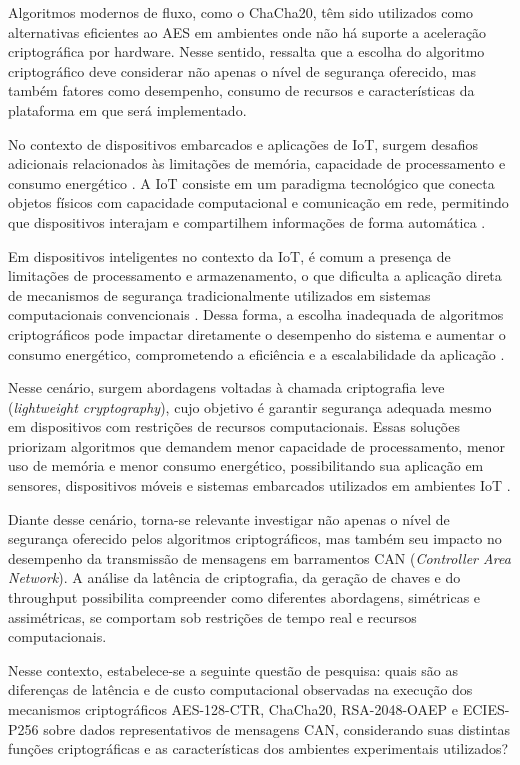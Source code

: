 Algoritmos modernos de fluxo, como o ChaCha20, têm sido utilizados como alternativas eficientes ao AES em ambientes onde não há suporte a aceleração criptográfica por hardware. Nesse sentido, \cite{almeida2025revisao} ressalta que a escolha do algoritmo criptográfico deve considerar não apenas o nível de segurança oferecido, mas também fatores como desempenho, consumo de recursos e características da plataforma em que será implementado.

No contexto de dispositivos embarcados e aplicações de IoT, surgem desafios adicionais relacionados às limitações de memória, capacidade de processamento e consumo energético \cite{pereira2020challenges}. A IoT consiste em um paradigma tecnológico que conecta objetos físicos com capacidade computacional e comunicação em rede, permitindo que dispositivos interajam e compartilhem informações de forma automática \cite{pauferro2020iot}. 

Em dispositivos inteligentes no contexto da IoT, é comum a presença de limitações de processamento e armazenamento, o que dificulta a aplicação direta de mecanismos de segurança tradicionalmente utilizados em sistemas computacionais convencionais \cite{pauferro2020iot}. Dessa forma, a escolha inadequada de algoritmos criptográficos pode impactar diretamente o desempenho do sistema e aumentar o consumo energético, comprometendo a eficiência e a escalabilidade da aplicação \cite{khan2025comprehensive}. 

Nesse cenário, surgem abordagens voltadas à chamada criptografia leve (\textit{lightweight cryptography}), cujo objetivo é garantir segurança adequada mesmo em dispositivos com restrições de recursos computacionais. Essas soluções priorizam algoritmos que demandem menor capacidade de processamento, menor uso de memória e menor consumo energético, possibilitando sua aplicação em sensores, dispositivos móveis e sistemas embarcados utilizados em ambientes IoT \cite{dhanda2020lightweight}. 

Diante desse cenário, torna-se relevante investigar não apenas o nível de segurança oferecido pelos algoritmos criptográficos, mas também seu impacto no desempenho da transmissão de mensagens em barramentos CAN (\textit{Controller Area Network}). A análise da latência de criptografia, da geração de chaves e do throughput possibilita compreender como diferentes abordagens, simétricas e assimétricas, se comportam sob restrições de tempo real e recursos computacionais.

Nesse contexto, estabelece-se a seguinte questão de pesquisa: quais são as diferenças de latência e de custo computacional observadas na execução dos mecanismos criptográficos AES-128-CTR, ChaCha20, RSA-2048-OAEP e ECIES-P256 sobre dados representativos de mensagens CAN, considerando suas distintas funções criptográficas e as características dos ambientes experimentais utilizados?

